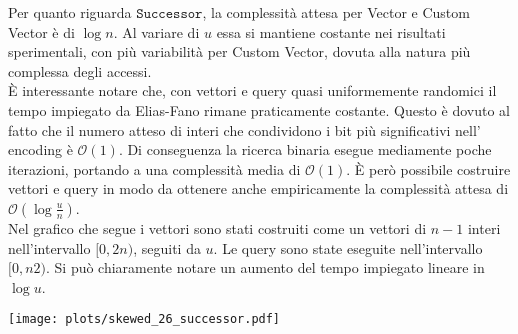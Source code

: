 \documentclass{article}
\newcommand{\ttt}{\texttt}
\newcommand*{\OO}{\ensuremath{\mathcal{O}}}
\begin{document}
Per quanto riguarda $\ttt{Successor}$, la complessit\`a attesa per Vector e Custom Vector \`e di $\log n$. Al variare di $u$ essa si mantiene costante nei risultati sperimentali, con pi\`u variabilit\`a per Custom Vector, dovuta alla natura pi\`u complessa degli accessi.\\
\`E interessante notare che, con vettori e query quasi uniformemente randomici il tempo impiegato da Elias-Fano rimane praticamente costante. Questo \`e dovuto al fatto che il numero atteso di interi che condividono i bit pi\`u significativi nell' encoding \`e $\OO (1)$. Di conseguenza la ricerca binaria esegue mediamente poche iterazioni, portando a una complessit\`a media di $\OO(1)$. \`E per\`o possibile costruire vettori e query in modo da ottenere anche empiricamente la complessit\`a attesa di $\OO(\log \frac{u}{n})$.\\
Nel grafico che segue i vettori sono stati costruiti come un vettori di $n-1$ interi nell'intervallo $[0, 2n)$, seguiti da $u$. Le query sono state eseguite nell'intervallo $[0, n2)$. Si pu\`o chiaramente notare un aumento del tempo impiegato lineare in $\log u$.

\texttt{[image: plots/skewed\_26\_successor.pdf]}



\end{document}
